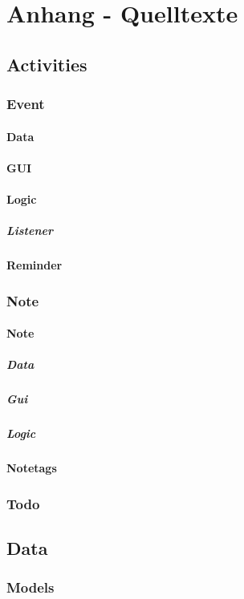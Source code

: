 \section{Anhang - Quelltexte}
\label{instal}

\subsection{Activities}
	\subsubsection{Event}
		\paragraph{Data}
		\paragraph{GUI}
		\paragraph{Logic}
			\subparagraph{Listener}
		\paragraph{Reminder}
	\subsubsection{Note}
		\paragraph{Note}
			\subparagraph{Data}
			\subparagraph{Gui}
			\subparagraph{Logic}
		\paragraph{Notetags}
	\subsubsection{Todo}
\subsection{Data}
	\subsubsection{Models}
